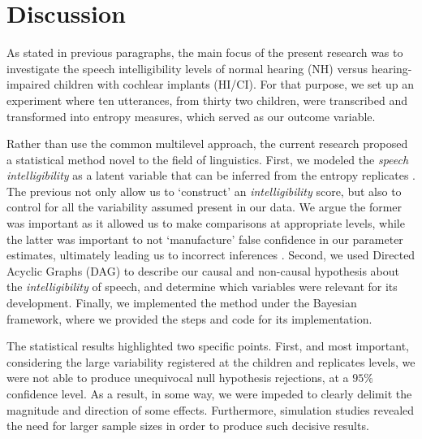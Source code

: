 \section{Discussion} \label{S:discussion}
%
As stated in previous paragraphs, the main focus of the present research was to investigate the speech intelligibility levels of normal hearing (NH) versus hearing-impaired children with cochlear implants (HI/CI). For that purpose, we set up an experiment where ten utterances, from thirty two children, were transcribed and transformed into entropy measures, which served as our outcome variable.

Rather than use the common multilevel approach, the current research proposed a statistical method novel to the field of linguistics. First, we modeled the \textit{speech intelligibility} as a latent variable that can be inferred from the entropy replicates \cite{Everitt_1984, Hoyle_et_al_2014}. The previous not only allow us to `construct' an \textit{intelligibility} score, but also to control for all the variability assumed present in our data. We argue the former was important as it allowed us to make comparisons at appropriate levels, while the latter was important to not `manufacture' false confidence in our parameter estimates, ultimately leading us to incorrect inferences \cite{McElreath_2020}. Second, we used Directed Acyclic Graphs (DAG) \cite{Pearl_2009, Cinelli_et_al_2021} to describe our causal and non-causal hypothesis about the \textit{intelligibility} of speech, and determine which variables were relevant for its development. Finally, we implemented the method under the Bayesian framework, where we provided the steps and code for its implementation.
%
\begin{comment}
	we believe that pre-aggregating procedures could be more pernicious for a proper statistical inference \citep{McElreath_2020}
\end{comment}
	
The statistical results highlighted two specific points. First, and most important, considering the large variability registered at the children and replicates levels, we were not able to produce unequivocal null hypothesis rejections, at a $95\%$ confidence level. As a result, in some way, we were impeded to clearly delimit the magnitude and direction of some effects. Furthermore, simulation studies revealed the need for larger sample sizes in order to produce such decisive results.


